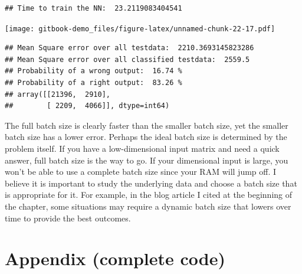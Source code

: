 \documentclass[
]{book}
\begin{document}
\begin{verbatim}
## Time to train the NN:  23.2119083404541
\end{verbatim}

\texttt{[image: gitbook-demo\_files/figure-latex/unnamed-chunk-22-17.pdf]}

\begin{verbatim}
## Mean Square error over all testdata:  2210.3693145823286
## Mean Square error over all classified testdata:  2559.5
## Probability of a wrong output:  16.74 %
## Probability of a right output:  83.26 %
## array([[21396,  2910],
##        [ 2209,  4066]], dtype=int64)
\end{verbatim}

The full batch size is clearly faster than the smaller batch size, yet the smaller batch size has a lower error. Perhaps the ideal batch size is determined by the problem itself. If you have a low-dimensional input matrix and need a quick answer, full batch size is the way to go. If your dimensional input is large, you won't be able to use a complete batch size since your RAM will jump off. I believe it is important to study the underlying data and choose a batch size that is appropriate for it. For example, in the blog article I cited at the beginning of the chapter, some situations may require a dynamic batch size that lowers over time to provide the best outcomes.

\hypertarget{appendix-complete-code-4}{%
\section{Appendix (complete code)}\label{appendix-complete-code-4}}
\end{document}
